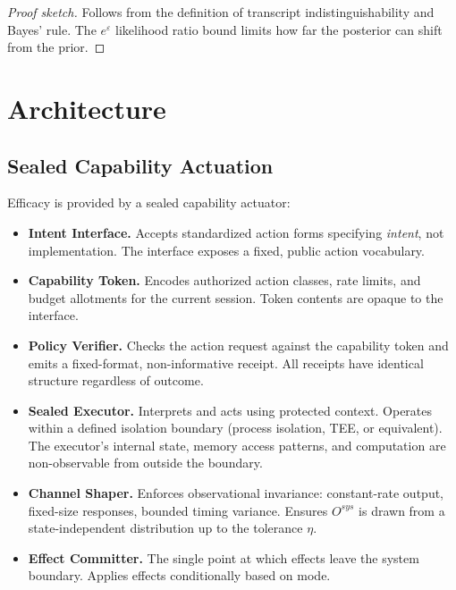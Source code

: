 \documentclass[11pt,a4paper]{article}
\begin{document}
\begin{proof}[Proof sketch]
Follows from the definition of transcript indistinguishability and Bayes' rule. The $e^\varepsilon$ likelihood ratio bound limits how far the posterior can shift from the prior.
\end{proof}

\section{Architecture}

\subsection{Sealed Capability Actuation}

Efficacy is provided by a sealed capability actuator:

\begin{itemize}
  \item \textbf{Intent Interface.} Accepts standardized action forms specifying \textit{intent}, not implementation. The interface exposes a fixed, public action vocabulary.
  \item \textbf{Capability Token.} Encodes authorized action classes, rate limits, and budget allotments for the current session. Token contents are opaque to the interface.
  \item \textbf{Policy Verifier.} Checks the action request against the capability token and emits a fixed-format, non-informative receipt. All receipts have identical structure regardless of outcome.
  \item \textbf{Sealed Executor.} Interprets and acts using protected context. Operates within a defined isolation boundary (process isolation, TEE, or equivalent). The executor's internal state, memory access patterns, and computation are non-observable from outside the boundary.
  \item \textbf{Channel Shaper.} Enforces observational invariance: constant-rate output, fixed-size responses, bounded timing variance. Ensures $O^{sys}$ is drawn from a state-independent distribution up to the tolerance $\eta$.
  \item \textbf{Effect Committer.} The single point at which effects leave the system boundary. Applies effects conditionally based on mode.
\end{itemize}
\end{document}
